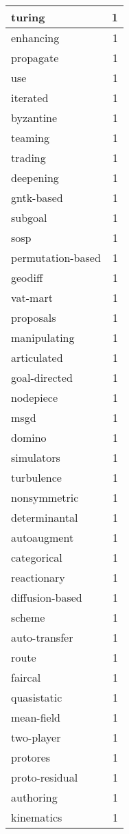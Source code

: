 \begin{table}[h]
\begin{tabular}{|l|r|}
\hline
turing & 1 \\
\hline
enhancing & 1 \\
\hline
propagate & 1 \\
\hline
use & 1 \\
\hline
iterated & 1 \\
\hline
byzantine & 1 \\
\hline
teaming & 1 \\
\hline
trading & 1 \\
\hline
deepening & 1 \\
\hline
gntk-based & 1 \\
\hline
subgoal & 1 \\
\hline
sosp & 1 \\
\hline
permutation-based & 1 \\
\hline
geodiff & 1 \\
\hline
vat-mart & 1 \\
\hline
proposals & 1 \\
\hline
manipulating & 1 \\
\hline
articulated & 1 \\
\hline
goal-directed & 1 \\
\hline
nodepiece & 1 \\
\hline
msgd & 1 \\
\hline
domino & 1 \\
\hline
simulators & 1 \\
\hline
turbulence & 1 \\
\hline
nonsymmetric & 1 \\
\hline
determinantal & 1 \\
\hline
autoaugment & 1 \\
\hline
categorical & 1 \\
\hline
reactionary & 1 \\
\hline
diffusion-based & 1 \\
\hline
scheme & 1 \\
\hline
auto-transfer & 1 \\
\hline
route & 1 \\
\hline
faircal & 1 \\
\hline
quasistatic & 1 \\
\hline
mean-field & 1 \\
\hline
two-player & 1 \\
\hline
protores & 1 \\
\hline
proto-residual & 1 \\
\hline
authoring & 1 \\
\hline
kinematics & 1 \\

\end{tabular}
\end{table}
